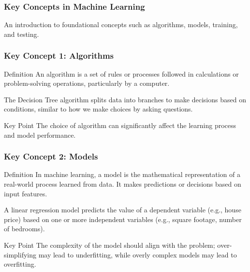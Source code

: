 \documentclass[aspectratio=169]{beamer}
\begin{document}
\begin{frame}[fragile]
    \frametitle{Key Concepts in Machine Learning}
    An introduction to foundational concepts such as algorithms, models, training, and testing.
\end{frame}

\begin{frame}[fragile]
    \frametitle{Key Concept 1: Algorithms}
    \begin{block}{Definition}
        An algorithm is a set of rules or processes followed in calculations or problem-solving operations, particularly by a computer.
    \end{block}
    \begin{example}
        The Decision Tree algorithm splits data into branches to make decisions based on conditions, similar to how we make choices by asking questions.
    \end{example}
    \begin{alertblock}{Key Point}
        The choice of algorithm can significantly affect the learning process and model performance.
    \end{alertblock}
\end{frame}

\begin{frame}[fragile]
    \frametitle{Key Concept 2: Models}
    \begin{block}{Definition}
        In machine learning, a model is the mathematical representation of a real-world process learned from data. It makes predictions or decisions based on input features.
    \end{block}
    \begin{example}
        A linear regression model predicts the value of a dependent variable (e.g., house price) based on one or more independent variables (e.g., square footage, number of bedrooms).
    \end{example}
    \begin{alertblock}{Key Point}
        The complexity of the model should align with the problem; over-simplifying may lead to underfitting, while overly complex models may lead to overfitting.
    \end{alertblock}
\end{frame}
\end{document}
